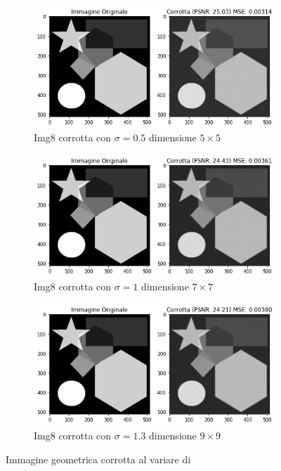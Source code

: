 \begin{figure}[H]
    \centering
    \begin{subfigure}{0.6\textwidth}
        \centering
        \includegraphics[width=\textwidth]{imgRel/img8corrotto/img8corrotta5x5.png}
        \caption{Img8 corrotta con $\sigma = 0.5$ dimensione $5 \times 5$}
        \label{fig: 8corrotto5}
    \end{subfigure}
    \begin{subfigure}{0.6\textwidth}
        \centering
        \includegraphics[width=\textwidth]{imgRel/img8corrotto/img8corrotta7x7.png}
        \caption{Img8 corrotta con $\sigma = 1$ dimensione $7\times 7$}
        \label{fig: 8corrotto7}
    \end{subfigure}
    \begin{subfigure}{0.6\textwidth}
        \centering
        \includegraphics[width=\textwidth]{imgRel/img8corrotto/img8corrotta9x9.png}
        \caption{Img8 corrotta con $\sigma = 1.3$ dimensione $9 \times 9$}
        \label{fig: 8corrotto9}
    \end{subfigure}
    \caption{Immagine geometrica corrotta al variare di }
    \label{fig: 8corrotto}
\end{figure}

